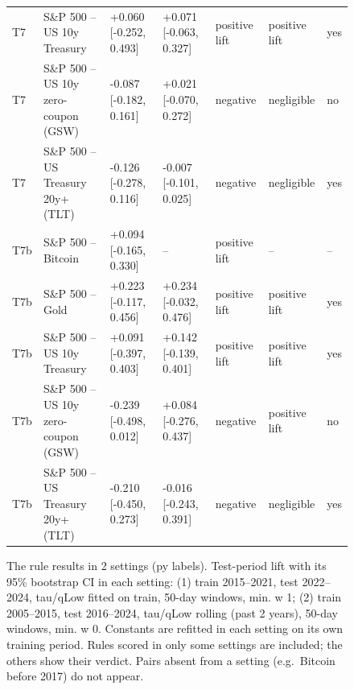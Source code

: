 \begin{figure}[t]
{\begin{tabular}{lllllll}
T7 & S\&P 500 -- US 10y Treasury & +0.060 [-0.252, 0.493] & +0.071 [-0.063, 0.327] & positive lift & positive lift & yes \\
T7 & S\&P 500 -- US 10y zero-coupon (GSW) & -0.087 [-0.182, 0.161] & +0.021 [-0.070, 0.272] & negative & negligible & no \\
T7 & S\&P 500 -- US Treasury 20y+ (TLT) & -0.126 [-0.278, 0.116] & -0.007 [-0.101, 0.025] & negative & negligible & yes \\
T7b & S\&P 500 -- Bitcoin & +0.094 [-0.165, 0.330] & -- & positive lift & -- & -- \\
T7b & S\&P 500 -- Gold & +0.223 [-0.117, 0.456] & +0.234 [-0.032, 0.476] & positive lift & positive lift & yes \\
T7b & S\&P 500 -- US 10y Treasury & +0.091 [-0.397, 0.403] & +0.142 [-0.139, 0.401] & positive lift & positive lift & yes \\
T7b & S\&P 500 -- US 10y zero-coupon (GSW) & -0.239 [-0.498, 0.012] & +0.084 [-0.276, 0.437] & negative & positive lift & no \\
T7b & S\&P 500 -- US Treasury 20y+ (TLT) & -0.210 [-0.450, 0.273] & -0.016 [-0.243, 0.391] & negative & negligible & yes \\
\bottomrule
\end{tabular}
}
\caption{The rule results in 2 settings (py labels). Test-period lift with its 95\% bootstrap CI in each setting: (1) train 2015–2021, test 2022–2024, tau/qLow fitted on train, 50-day windows, min. w 1; (2) train 2005–2015, test 2016–2024, tau/qLow rolling (past 2 years), 50-day windows, min. w 0. Constants are refitted in each setting on its own training period. Rules scored in only some settings are included; the others show their verdict. Pairs absent from a setting (e.g.\ Bitcoin before 2017) do not appear.}
\label{fig:robustness}
\end{figure}
